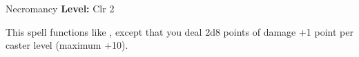 {Necromancy}
{
	\textbf{Level:}
	Clr 2\\
}
{
	This spell functions like , except that you deal 2d8 points of damage +1 point per caster level (maximum +10).

}

